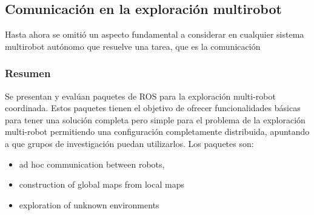 





\subsection{Comunicación en la exploración multirobot}
Hasta ahora se omitió un aspecto fundamental a considerar en cualquier sistema multirobot autónomo que resuelve una tarea, que es la comunicación %

\subsubsection{Resumen}
Se presentan y evalúan paquetes de ROS para la exploración multi-robot coordinada. Estos paquetes tienen el objetivo de ofrecer funcionalidades básicas para tener una solución completa pero simple para el problema de la exploración multi-robot permitiendo una configuración completamente distribuida, apuntando a que grupos de investigación puedan utilizarlos. Los paquetes son:
\begin{itemize}
  \item ad hoc communication between robots,
  \item construction of global maps from local maps
  \item exploration of unknown environments
\end{itemize}

